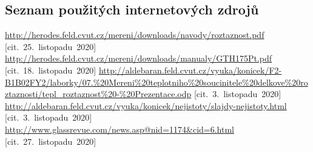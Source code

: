 \documentclass[a4paper,12pt]{article}   %
\begin{document}
\clearpage
\renewcommand{\refname}{Seznam použité literatury a~zdrojů informací} 

\begin{thebibliography}{99}

\subsection*{Seznam použitých internetových zdrojů}
     \url{http://herodes.feld.cvut.cz/mereni/downloads/navody/roztaznost.pdf} [cit.~25.~listopadu~2020]
     \url{http://herodes.feld.cvut.cz/mereni/downloads/manualy/GTH175Pt.pdf} [cit.~18.~listopadu~2020]
     \url{http://aldebaran.feld.cvut.cz/vyuka/konicek/F2-B1B02FY2/laborky/07.%20Mereni%20teplotniho%20soucinitele%20delkove%20roztaznosti/tepl_roztaznost%20-%20Prezentace.odp} [cit.~3.~listopadu~2020]
     \url{http://aldebaran.feld.cvut.cz/vyuka/konicek/nejistoty/slajdy-nejistoty.html} [cit.~3.~listopadu~2020]
     \url{http://www.glassrevue.com/news.asp@nid=1174&cid=6.html} [cit.~27.~listopadu~2020]
\end{thebibliography}
\end{document}
